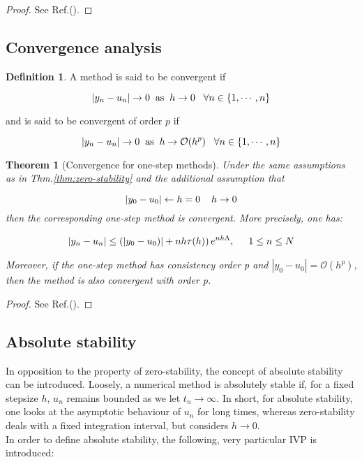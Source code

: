 \documentclass[11pt]{article}
\theoremstyle{theorem}
\newtheorem{theorem}{Theorem}
\theoremstyle{definition}
\newtheorem{definition}{Definition}
\begin{document}
\begin{proof}
	See Ref.(\cite{lec-notes}).
\end{proof}


\subsection{Convergence analysis}
\begin{definition}
	\label{def:convergence}
	A method is said to be convergent if 
	
	$$|y_n-u_n|\rightarrow 0\hspace{2mm}\text{as}\hspace{2mm}h\rightarrow 0\hspace{3mm}\forall n\in\lbrace 1,\cdots, n\rbrace$$
	
	and is said to be convergent of order $p$ if 
	
	
	$$|y_n-u_n|\rightarrow 0\hspace{2mm}\text{as}\hspace{2mm}h\rightarrow \mathcal{O}(h^p)\hspace{3mm}\forall n\in\lbrace 1,\cdots, n\rbrace$$
\end{definition}

\begin{theorem}[Convergence for one-step methods]
	\label{thm:convergence-one-step}
	Under the same assumptions as in Thm.\ref{thm:zero-stability} and the additional assumption that 
	
	$$|y_0-u_0|\leftarrow h=0\hspace{4mm}h\rightarrow 0$$
    then the corresponding one-step method is convergent. More precisely, one has:
    
    \begin{align}
    	\label{eqn:convergence-one-step}
    	|y_n-u_n|\le\left(|y_0-u_0)|+nh\tau (h)\right)e^{nh\Lambda},\hspace{5mm}1\le n\le N
    \end{align}
    
    Moreover, if the one-step method has consistency order p and $|y_0-u_0|=\mathcal{O}(h^p)$, then the method is also convergent with order p.\\
\end{theorem}

\begin{proof}
	See Ref.(\cite{lec-notes}).
\end{proof}

\subsection{Absolute stability}
In opposition to the property of zero-stability, the concept of absolute stability can be introduced. Loosely, a numerical method is absolutely stable if, for a fixed stepsize
$h$, $u_n$ remains bounded as we let $t_n\rightarrow\infty$. In short, for absolute stability, one looks at the asymptotic behaviour of $u_n$ for long times, whereas zero-stability deals with a fixed integration interval, but considers $h\rightarrow 0$.\\
In order to define absolute stability, the following, very particular IVP is introduced: 
\end{document}
